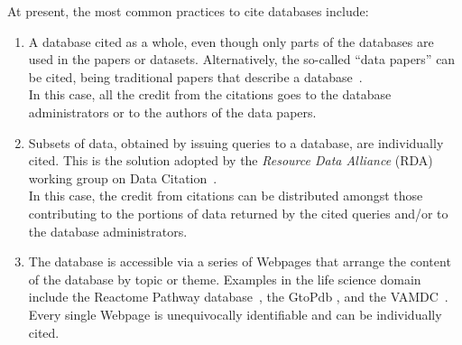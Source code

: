 At present, the most common practices to cite databases include:
\begin{enumerate}
    \item A database cited as a whole, even though only parts of the databases are used in the papers or datasets. Alternatively, the so-called ``data papers'' can be cited, being traditional papers that describe a database~\citep{CandelaEtAl2015}. \\
    In this case, all the credit from the citations goes to the database administrators or to the authors of the data papers. 
    \item Subsets of data, obtained by issuing queries to a database, are individually cited. This is the solution adopted by the \emph{Resource Data Alliance} (RDA) working group on Data Citation~\citep{RauberEtAl2016}. \\
    In this case, the credit from citations can be distributed amongst those contributing to the portions of data returned by the cited queries and/or to the database administrators. 
    \item The database is accessible via a series of Webpages that arrange the content of the database by topic or theme. Examples in the life science domain include the Reactome Pathway database~\citep{reactome2016}, the GtoPdb \citep{iuphar2018}, and the VAMDC~\citep{ZwolfEtAl2016}.
     Every single Webpage is unequivocally identifiable and can be individually cited. 
    
\end{enumerate}

